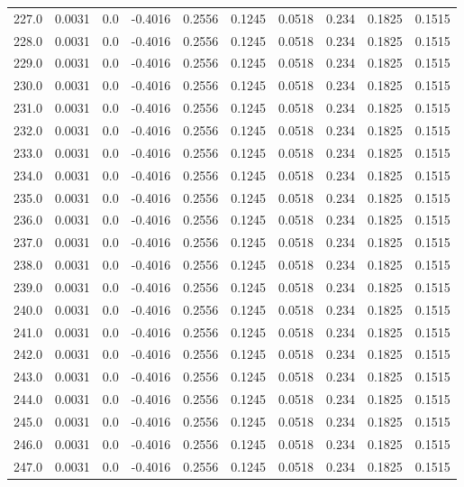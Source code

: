 \begin{longtable}{lrrrrrrrrr}
227.0 & 0.0031 & 0.0 & -0.4016 & 0.2556 & 0.1245 & 0.0518 & 0.234 & 0.1825 & 0.1515 \\
228.0 & 0.0031 & 0.0 & -0.4016 & 0.2556 & 0.1245 & 0.0518 & 0.234 & 0.1825 & 0.1515 \\
229.0 & 0.0031 & 0.0 & -0.4016 & 0.2556 & 0.1245 & 0.0518 & 0.234 & 0.1825 & 0.1515 \\
230.0 & 0.0031 & 0.0 & -0.4016 & 0.2556 & 0.1245 & 0.0518 & 0.234 & 0.1825 & 0.1515 \\
231.0 & 0.0031 & 0.0 & -0.4016 & 0.2556 & 0.1245 & 0.0518 & 0.234 & 0.1825 & 0.1515 \\
232.0 & 0.0031 & 0.0 & -0.4016 & 0.2556 & 0.1245 & 0.0518 & 0.234 & 0.1825 & 0.1515 \\
233.0 & 0.0031 & 0.0 & -0.4016 & 0.2556 & 0.1245 & 0.0518 & 0.234 & 0.1825 & 0.1515 \\
234.0 & 0.0031 & 0.0 & -0.4016 & 0.2556 & 0.1245 & 0.0518 & 0.234 & 0.1825 & 0.1515 \\
235.0 & 0.0031 & 0.0 & -0.4016 & 0.2556 & 0.1245 & 0.0518 & 0.234 & 0.1825 & 0.1515 \\
236.0 & 0.0031 & 0.0 & -0.4016 & 0.2556 & 0.1245 & 0.0518 & 0.234 & 0.1825 & 0.1515 \\
237.0 & 0.0031 & 0.0 & -0.4016 & 0.2556 & 0.1245 & 0.0518 & 0.234 & 0.1825 & 0.1515 \\
238.0 & 0.0031 & 0.0 & -0.4016 & 0.2556 & 0.1245 & 0.0518 & 0.234 & 0.1825 & 0.1515 \\
239.0 & 0.0031 & 0.0 & -0.4016 & 0.2556 & 0.1245 & 0.0518 & 0.234 & 0.1825 & 0.1515 \\
240.0 & 0.0031 & 0.0 & -0.4016 & 0.2556 & 0.1245 & 0.0518 & 0.234 & 0.1825 & 0.1515 \\
241.0 & 0.0031 & 0.0 & -0.4016 & 0.2556 & 0.1245 & 0.0518 & 0.234 & 0.1825 & 0.1515 \\
242.0 & 0.0031 & 0.0 & -0.4016 & 0.2556 & 0.1245 & 0.0518 & 0.234 & 0.1825 & 0.1515 \\
243.0 & 0.0031 & 0.0 & -0.4016 & 0.2556 & 0.1245 & 0.0518 & 0.234 & 0.1825 & 0.1515 \\
244.0 & 0.0031 & 0.0 & -0.4016 & 0.2556 & 0.1245 & 0.0518 & 0.234 & 0.1825 & 0.1515 \\
245.0 & 0.0031 & 0.0 & -0.4016 & 0.2556 & 0.1245 & 0.0518 & 0.234 & 0.1825 & 0.1515 \\
246.0 & 0.0031 & 0.0 & -0.4016 & 0.2556 & 0.1245 & 0.0518 & 0.234 & 0.1825 & 0.1515 \\
247.0 & 0.0031 & 0.0 & -0.4016 & 0.2556 & 0.1245 & 0.0518 & 0.234 & 0.1825 & 0.1515 \\

\end{longtable}
